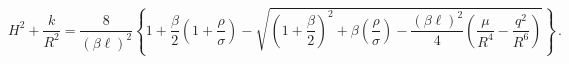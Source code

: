 \begin{equation}H^2+\frac{k}{R^2}=\frac{8}{(\beta\ell)^2}\left\{1+
\frac{\beta}{2}\left(1+\frac{\rho}{\sigma}\right)-
\sqrt{\left(1+\frac{\beta}{2}\right)^2+\beta\left(\frac{\rho}{\sigma}\right)-
\frac{(\beta\ell)^2}{4}\left(\frac{\mu}{R^4}-\frac{q^2}{R^6}\right)}\right\}\,.
\end{equation}

